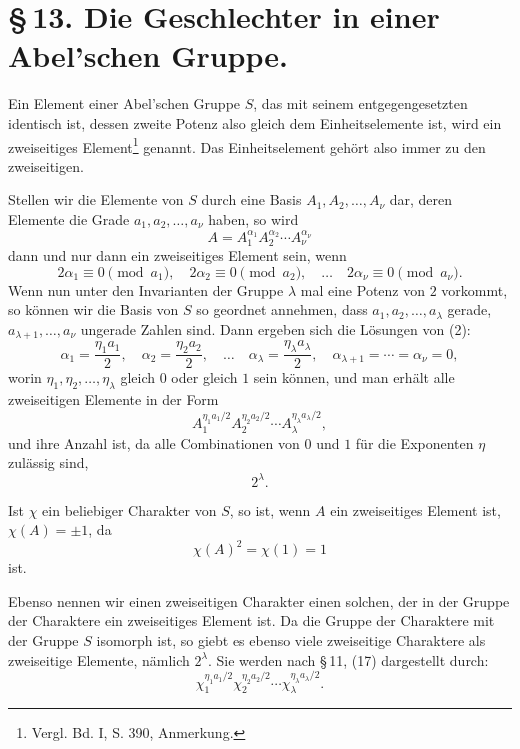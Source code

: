 \documentclass[11pt]{article}
\begin{document}
\section*{\S\,13. Die Geschlechter in einer Abel'schen Gruppe.}

Ein Element einer Abel'schen Gruppe $S$, das mit seinem entgegengesetzten identisch ist, dessen zweite Potenz also gleich dem Einheitselemente ist, wird ein zweiseitiges Element\footnote{Vergl. Bd. I, S. 390, Anmerkung.} genannt. Das Einheitselement gehört also immer zu den zweiseitigen.

Stellen wir die Elemente von $S$ durch eine Basis $A_1,A_2,
\ldots,A_\nu$ dar, deren Elemente die Grade $a_1,a_2,
\ldots,a_\nu$ haben, so wird
\begin{equation}
A=A_1^{\alpha_1}A_2^{\alpha_2}\cdots A_\nu^{\alpha_\nu}
\tag{1}
\end{equation}
dann und nur dann ein zweiseitiges Element sein, wenn
\begin{equation}
2\alpha_1\equiv0\pmod{a_1},
\quad 2\alpha_2\equiv0\pmod{a_2},
\quad\ldots\quad
2\alpha_\nu\equiv0\pmod{a_\nu}.
\tag{2}
\end{equation}
Wenn nun unter den Invarianten der Gruppe $\lambda$ mal eine Potenz von $2$ vorkommt, so können wir die Basis von $S$ so geordnet annehmen, dass $a_1,a_2,
\ldots,a_\lambda$ gerade, $a_{\lambda+1},
\ldots,a_\nu$ ungerade Zahlen sind. Dann ergeben sich die Lösungen von (2):
\[
\alpha_1=\frac{\eta_1a_1}{2},
\quad
\alpha_2=\frac{\eta_2a_2}{2},
\quad\ldots\quad
\alpha_\lambda=\frac{\eta_\lambda a_\lambda}{2},
\quad
\alpha_{\lambda+1}=\cdots=\alpha_\nu=0,
\]
worin $\eta_1,\eta_2,
\ldots,
\eta_\lambda$ gleich $0$ oder gleich $1$ sein können, und man erhält alle zweiseitigen Elemente in der Form
\[
A_1^{\eta_1a_1/2}A_2^{\eta_2a_2/2}\cdots A_\lambda^{\eta_\lambda a_\lambda/2},
\]
und ihre Anzahl ist, da alle Combinationen von $0$ und $1$ für die Exponenten $\eta$ zulässig sind,
\[
2^\lambda.
\]

Ist $\chi$ ein beliebiger Charakter von $S$, so ist, wenn $A$ ein zweiseitiges Element ist, $\chi(A)=\pm1$, da
\[
\chi(A)^2=\chi(1)=1
\]
ist.

Ebenso nennen wir einen zweiseitigen Charakter einen solchen, der in der Gruppe der Charaktere ein zweiseitiges Element ist. Da die Gruppe der Charaktere mit der Gruppe $S$ isomorph ist, so giebt es ebenso viele zweiseitige Charaktere als zweiseitige Elemente, nämlich $2^\lambda$. Sie werden nach \S\,11, (17) dargestellt durch:
\[
\chi_1^{\eta_1a_1/2}\chi_2^{\eta_2a_2/2}\cdots\chi_\lambda^{\eta_\lambda a_\lambda/2}.
\]
\end{document}

